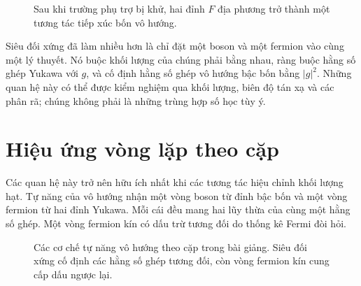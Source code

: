 \begin{figure}[H]
\centering
{}
\caption{Sau khi trường phụ trợ bị khử, hai đỉnh \(F\) địa phương trở thành một tương tác tiếp xúc bốn vô hướng.}
\end{figure}

Siêu đối xứng đã làm nhiều hơn là chỉ đặt một boson và một fermion vào cùng một lý thuyết. Nó buộc khối lượng của chúng phải bằng nhau, ràng buộc hằng số ghép Yukawa với \(g\), và cố định hằng số ghép vô hướng bậc bốn bằng \(|g|^2\). Những quan hệ này có thể được kiểm nghiệm qua khối lượng, biên độ tán xạ và các phân rã; chúng không phải là những trùng hợp số học tùy ý.

\section{Hiệu ứng vòng lặp theo cặp}

Các quan hệ này trở nên hữu ích nhất khi các tương tác hiệu chỉnh khối lượng hạt. Tự năng của vô hướng nhận một vòng boson từ đỉnh bậc bốn và một vòng fermion từ hai đỉnh Yukawa. Mỗi cái đều mang hai lũy thừa của cùng một hằng số ghép. Một vòng fermion kín có dấu trừ tương đối do thống kê Fermi đòi hỏi.

\begin{figure}[H]
\centering
{}
\caption{Các cơ chế tự năng vô hướng theo cặp trong bài giảng. Siêu đối xứng cố định các hằng số ghép tương đối, còn vòng fermion kín cung cấp dấu ngược lại.}
\end{figure}

